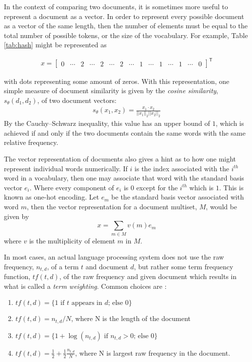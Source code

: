 In the context of comparing two documents, it is sometimes more useful to represent a document as a vector.  In order to represent every possible document as a vector of the same length, then the number of elements must be equal to the total number of possible tokens, or the size of the vocabulary.  For example, Table \ref{tab:hash} might be represented as 
\begin{singlespace}
\begin{align}
x = 
\begin{bmatrix}
0 & \cdots & 2 & \cdots & 2 & \cdots & 2 & \cdots & 1 & \cdots & 1 & \cdots & 1 & \cdots & 0
\end{bmatrix}^\mathsf{T}
\end{align}
\end{singlespace}
\noindent
with dots representing some amount of zeros.  With this representation, one simple measure of document similarity is given by the \textit{cosine similarity}, $s_\theta(d_1,d_2)$, of two document vectors:
\begin{align}
s_\theta(x_1,x_2) = \frac{x_1\cdot x_2}{||x_1||_2 ||x_2||_2}
\end{align}
By the Cauchy–Schwarz inequality, this value has an upper bound of $1$, which is achieved if and only if the two documents contain the same words with the same relative frequency.

The vector representation of documents also gives a hint as to how one might represent individual words numerically.  If $i$ is the index associated with the $i^{th}$ word in a vocabulary, then one may associate that word with the standard basis vector $e_i$.  Where every component of $e_i$ is $0$ except for the $i^{th}$ which is $1$.  This is known as one-hot encoding.  Let $e_m$ be the standard basis vector associated with word $m$, then the vector representation for a document multiset, $M$, would be given by
\begin{equation}
x = \sum_{m\in M} v(m)e_m
\end{equation}
where $v$ is the multiplicity of element $m$ in $M$.

In most cases, an actual language processing system does not use the raw frequency, $n_{t,d}$, of a term $t$ and document $d$, but rather some term frequency function, $tf(t,d)$, of the raw frequency and given document which results in what is called a \textit{term weighting}.  Common choices are \cite{cm08}:

\begin{enumerate}
\item $tf(t,d) = \{1 \text{ if $t$ appears in $d$; else } 0\}$
\item $tf(t,d) = n_{t,d} / N$, where N is the length of the document
\item $tf(t,d) = \{1 + \log(n_{t,d}) \text{ if $n_{t,d} > 0$; else } 0\}$
\item $tf(t,d) = \frac{1}{2} + \frac{1}{2} \frac{n_{t,d}}{N}$, where N is largest raw frequency in the document.
\end{enumerate}

